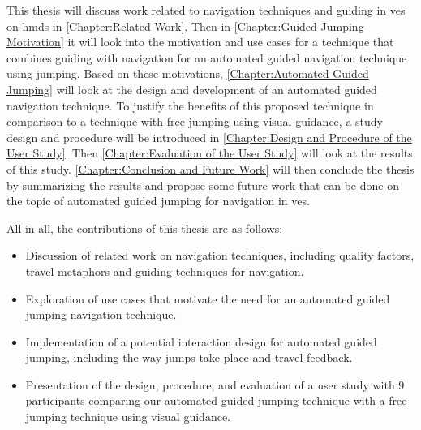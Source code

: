 This thesis will discuss work related to navigation techniques and guiding in \acrshort{ve}s on \acrfull{hmd}s in \cref{Chapter:Related Work}. Then in \cref{Chapter:Guided Jumping Motivation} it will look into the motivation and use cases for a technique that combines guiding with navigation for an automated guided navigation technique using jumping. Based on these motivations, \cref{Chapter:Automated Guided Jumping} will look at the design and development of an automated guided navigation technique. To justify the benefits of this proposed technique in comparison to a technique with free jumping using visual guidance, a study design and procedure will be introduced in \cref{Chapter:Design and Procedure of the User Study}. Then \cref{Chapter:Evaluation of the User Study} will look at the results of this study. \cref{Chapter:Conclusion and Future Work} will then conclude the thesis by summarizing the results and propose some future work that can be done on the topic of automated guided jumping for navigation in \acrshort{ve}s.

All in all, the contributions of this thesis are as follows:
\begin{itemize}
	\item Discussion of related work on navigation techniques, including quality factors, travel metaphors and guiding techniques for navigation.
	\item Exploration of use cases that motivate the need for an automated guided jumping navigation technique.
	\item Implementation of a potential interaction design for automated guided jumping, including the way jumps take place and travel feedback.
	\item Presentation of the design, procedure, and evaluation of a user study with 9 participants comparing our automated guided jumping technique with a free jumping technique using visual guidance.
\end{itemize}
